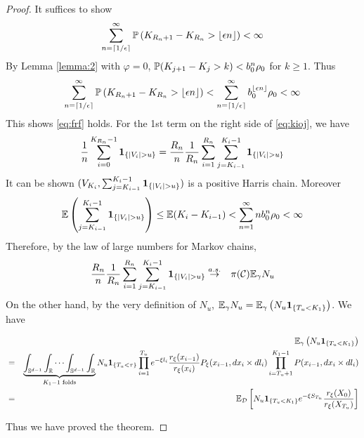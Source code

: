 \documentclass[aoas,preprint]{imsart}
\numberwithin{equation}{section}
\theoremstyle{plain}
\begin{document}
\begin{proof}
  It suffices to show
  \[
  \sum_{n=\ceil{1/\epsilon}}^\infty \P\left(
    {K_{R_n + 1} - K_{R_n}} > \floor{\epsilon n}
  \right) < \infty
  \]
  By Lemma \ref{lemma:2} with $\varphi = 0$,
  $\P(K_{j + 1} - K_j > k) < b_0^n \rho_0$ for $k \geq 1$.
  Thus
  \[
    \sum_{n=\ceil{1/\epsilon}}^\infty \P\left(
    {K_{R_n + 1} - K_{R_n}} > \floor{\epsilon n}
  \right)
  <
  \sum_{n=\ceil{1/\epsilon}}^\infty b_0^{\floor{\epsilon n}} \rho_0 < \infty
  \]
  This shows \eqref{eq:frf} holds.
  For the 1st term on the right side of \eqref{eq:kioj}, we have
  \[
  {1 \over n} \sum_{i=0}^{K_{R_n}-1} \1{|V_i| > u}
    =
    {R_n \over n} {1 \over R_n} \sum_{i=1}^{R_n}
    \sum_{j=K_{i-1}}^{K_i-1}\1{|V_i| > u}
  \]
  It can be shown $(V_{K_i}, \sum_{j=K_{i-1}}^{K_i-1}\1{|V_i| > u})$
  is a positive Harris chain. Moreover
  \[
  \E \left(
    \sum_{j=K_{i-1}}^{K_i-1}\1{|V_i| > u}
  \right)
  \leq
  \E (K_i - K_{i-1}) < \sum_{n=1}^\infty n b_0^n \rho_0 < \infty
  \]
  Therefore, by the law of large numbers for Markov chains,
  \begin{eqnarray*}
    {R_n \over n} {1 \over R_n} \sum_{i=1}^{R_n}
    \sum_{j=K_{i-1}}^{K_i-1}\1{|V_i| > u}
    &\overset{a.s.}{\to}& \pi(\mathcal C) \E_\gamma N_u
  \end{eqnarray*}
  On the other hand, by the very definition of $N_u$,
  $\E_\gamma N_u = \E_\gamma \left( N_u \1{T_u < K_1}\right)$. We have
  \begin{small}
    \begin{eqnarray*}
      && \E_\gamma \left( N_u \1{T_u < K_1}\right) \\
      &=&
      \underbrace{
        \int_{\sphere^{d-1}} \int_{\reals}
        \cdots
        \int_{\sphere^{d-1}} \int_{\reals}
      }_{K_1 - 1\text{ folds}}
      N_u \1{T_u < \tau}
      \prod_{i=1}^{T_u} e^{-\xi l_i}
      {r_\xi(x_{i-1}) \over r_\xi(x_{i})}P_\xi(x_{i-1}, dx_i \times dl_i)
      \prod_{i=T_u+1}^{K_1 - 1} P(x_{i-1}, dx_i \times d l_i) \\
      &=&
      \E_{\mathcal D}
      \left[
        N_u \1{T_u < K_1} e^{-\xi S_{T_u}}
        {r_\xi(X_0)
          \over
          r_\xi(X_{T_u})
        }
      \right]
    \end{eqnarray*}
  \end{small}
  Thus we have proved the theorem.
\end{proof}
\end{document}
